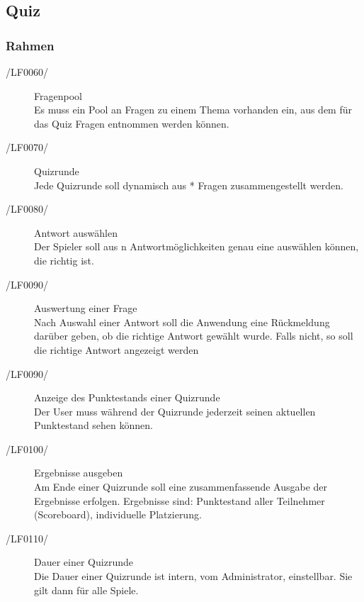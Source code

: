 \documentclass[11pt,a4paper]{scrreprt}
\begin{document}
\subsection{Quiz}

\subsubsection{Rahmen}
\begin{description}
\item[/LF0060/] Fragenpool \\
Es muss ein Pool an Fragen zu einem Thema vorhanden ein, aus dem für das Quiz Fragen entnommen werden können.

\item[/LF0070/] Quizrunde \\
Jede Quizrunde soll dynamisch aus * Fragen zusammengestellt werden.

\item[/LF0080/] Antwort auswählen \\
Der Spieler soll aus n Antwortmöglichkeiten genau eine auswählen können, die richtig ist.
\item[/LF0090/]Auswertung einer Frage \\ 
Nach Auswahl einer Antwort soll die Anwendung eine Rückmeldung darüber geben, ob die richtige Antwort gewählt wurde. Falls nicht, so soll die richtige Antwort angezeigt werden %

\item[/LF0090/]Anzeige des Punktestands einer Quizrunde \\ 
Der User muss während der Quizrunde jederzeit seinen aktuellen Punktestand sehen können.

\item[/LF0100/] Ergebnisse ausgeben \\
Am Ende einer Quizrunde soll eine zusammenfassende Ausgabe der Ergebnisse erfolgen. Ergebnisse sind: Punktestand aller Teilnehmer (Scoreboard),  individuelle Platzierung.

\item[/LF0110/] Dauer einer Quizrunde \\
 Die Dauer einer Quizrunde ist intern, vom Administrator, einstellbar. Sie gilt dann für alle Spiele.
\end{description}
\end{document}
